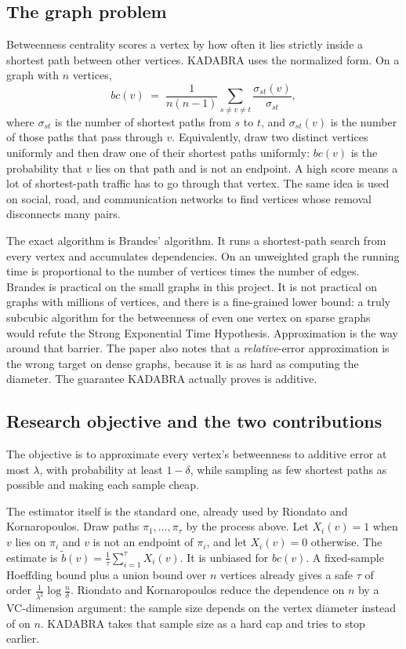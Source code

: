 \documentclass[11pt]{article}
\begin{document}
\subsection{The graph problem}

Betweenness centrality scores a vertex by how often it lies strictly inside a shortest path between other vertices. KADABRA uses the normalized form. On a graph with $n$ vertices,
\[
bc(v) \;=\; \frac{1}{n(n-1)} \sum_{s \neq v \neq t} \frac{\sigma_{st}(v)}{\sigma_{st}},
\]
where $\sigma_{st}$ is the number of shortest paths from $s$ to $t$, and $\sigma_{st}(v)$ is the number of those paths that pass through $v$. Equivalently, draw two distinct vertices uniformly and then draw one of their shortest paths uniformly: $bc(v)$ is the probability that $v$ lies on that path and is not an endpoint. A high score means a lot of shortest-path traffic has to go through that vertex. The same idea is used on social, road, and communication networks to find vertices whose removal disconnects many pairs.

The exact algorithm is Brandes' algorithm. It runs a shortest-path search from every vertex and accumulates dependencies. On an unweighted graph the running time is proportional to the number of vertices times the number of edges. Brandes is practical on the small graphs in this project. It is not practical on graphs with millions of vertices, and there is a fine-grained lower bound: a truly subcubic algorithm for the betweenness of even one vertex on sparse graphs would refute the Strong Exponential Time Hypothesis. Approximation is the way around that barrier. The paper also notes that a \emph{relative}-error approximation is the wrong target on dense graphs, because it is as hard as computing the diameter. The guarantee KADABRA actually proves is additive.

\subsection{Research objective and the two contributions}

The objective is to approximate every vertex's betweenness to additive error at most $\lambda$, with probability at least $1-\delta$, while sampling as few shortest paths as possible and making each sample cheap.

The estimator itself is the standard one, already used by Riondato and Kornaropoulos. Draw paths $\pi_1,\ldots,\pi_\tau$ by the process above. Let $X_i(v)=1$ when $v$ lies on $\pi_i$ and $v$ is not an endpoint of $\pi_i$, and let $X_i(v)=0$ otherwise. The estimate is $\tilde b(v)=\frac{1}{\tau}\sum_{i=1}^{\tau} X_i(v)$. It is unbiased for $bc(v)$. A fixed-sample Hoeffding bound plus a union bound over $n$ vertices already gives a safe $\tau$ of order $\frac{1}{\lambda^2}\log\frac{n}{\delta}$. Riondato and Kornaropoulos reduce the dependence on $n$ by a VC-dimension argument: the sample size depends on the vertex diameter instead of on $n$. KADABRA takes that sample size as a hard cap and tries to stop earlier.
\end{document}
